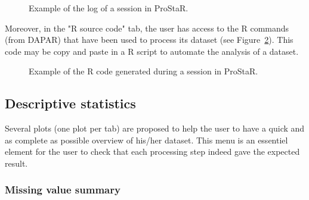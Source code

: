 \documentclass[12pt]{article}
\begin{document}
\begin{figure}[b]
\centering
{}
\caption{Example of the log of a session in ProStaR.}\label{fig:sessionlog}
\end {figure}

Moreover, in the "R source code" tab, the user has access to the R commands 
(from DAPAR) that have been used to process its dataset 
(see Figure~\ref{fig:Rcode}). This code may be copy and paste in a R script to 
automate the analysis of a dataset.

\begin{figure}[b]
\centering
{}
\caption{Example of the R code generated during a session in ProStaR.}\label{fig:Rcode}
\end {figure}


\subsection{Descriptive statistics}\label{sec:descriptivestatistics}

Several plots (one plot per tab) are proposed to help the user to have a 
quick and as complete as possible overview of his/her dataset. This menu is 
an essentiel element for the user to check that each processing step indeed 
gave the expected result.


\subsubsection{Missing value summary}
\end{document}

